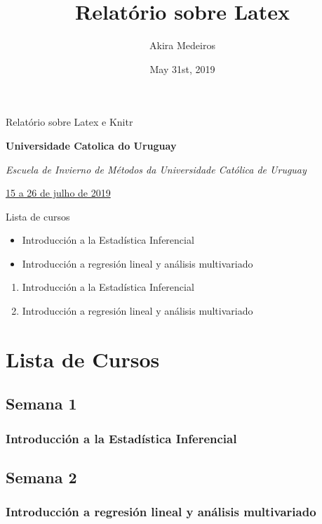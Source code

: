 \documentclass{article}\usepackage[]{graphicx}\usepackage[]{color}
\begin{document}
\title{Relatório sobre Latex}
\date{May 31st, 2019}
\author{Akira Medeiros}

\maketitle 

Relatório sobre Latex e Knitr

\vspace{0.5cm}

\textbf{Universidade Catolica do Uruguay}

\textit{Escuela de Invierno de Métodos da Universidade Católica de Uruguay}

\underline{15 a 26 de julho de 2019}

\vspace{0.5cm}

Lista de cursos
\begin{itemize} 
\item Introducción a la Estadística Inferencial 
\item Introducción a regresión lineal y análisis multivariado 
\end{itemize}


\begin{enumerate} 
\item Introducción a la Estadística Inferencial 
\item Introducción a regresión lineal y análisis multivariado
\end{enumerate}

\section{Lista de Cursos}
\subsection{Semana 1}
\subsubsection{Introducción a la Estadística Inferencial}
\subsection{Semana 2}
\subsubsection{Introducción a regresión lineal y análisis multivariado}
\end{document}
